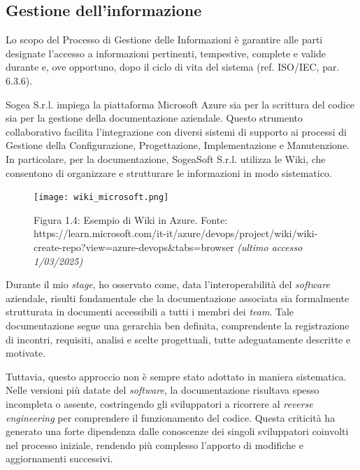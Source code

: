         \subsection{Gestione dell’informazione}

        Lo scopo del Processo di Gestione delle Informazioni è garantire alle parti designate l’accesso a informazioni pertinenti, tempestive, complete e valide durante e, ove opportuno, dopo il ciclo di vita del sistema (ref. ISO/IEC, par. 6.3.6).  

        \noindent Sogea S.r.l. impiega la piattaforma Microsoft Azure sia per la scrittura del codice sia per la gestione della documentazione aziendale. Questo strumento collaborativo facilita l'integrazione con diversi sistemi di supporto ai processi di Gestione della Configurazione, Progettazione, Implementazione e Manutenzione. In particolare, per la documentazione, SogeaSoft S.r.l. utilizza le Wiki, che consentono di organizzare e strutturare le informazioni in modo sistematico.  

        \begin{figure}[H]
            \centering
            \texttt{[image: wiki\_microsoft.png]}
            \caption{Figura 1.4: Esempio di Wiki in Azure. Fonte: https://learn.microsoft.com/it-it/azure/devops/project/wiki/wiki-create-repo?view=azure-devops&tabs=browser \textit{(ultimo accesso 1/03/2025)}}
            \label{fig:enter-label}
        \end{figure}

        \noindent Durante il mio \textit{stage}, ho osservato come, data l’interoperabilità del \textit{software} aziendale, risulti fondamentale che la documentazione associata sia formalmente strutturata in documenti accessibili a tutti i membri dei \textit{team}. Tale documentazione segue una gerarchia ben definita, comprendente la registrazione di incontri, requisiti, analisi e scelte progettuali, tutte adeguatamente descritte e motivate.  

        \noindent Tuttavia, questo approccio non è sempre stato adottato in maniera sistematica. Nelle versioni più datate del \textit{software}, la documentazione risultava spesso incompleta o assente, costringendo gli sviluppatori a ricorrere al \textit{reverse engineering} per comprendere il funzionamento del codice. Questa criticità ha generato una forte dipendenza dalle conoscenze dei singoli sviluppatori coinvolti nel processo iniziale, rendendo più complesso l’apporto di modifiche e aggiornamenti successivi.  

